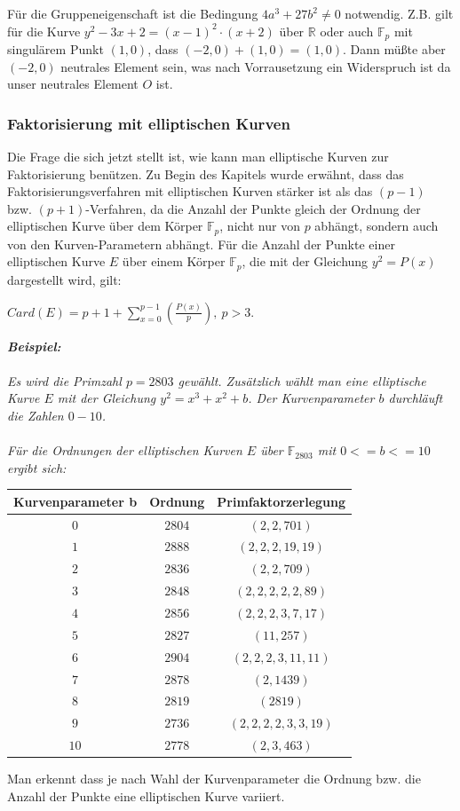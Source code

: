 \documentclass[10pt, bigheadings]{scrartcl}
\begin{document}
Für die Gruppeneigenschaft ist die Bedingung $4a^3+27b^2 \neq 0$ notwendig. Z.B.
gilt für die Kurve $y^2-3x+2 = (x-1)^2\cdot(x+2)$ über $\mathbb R$ oder auch 
$\mathbb F_p$ mit singulärem Punkt $(1,0)$, dass $(-2,0)+(1,0) = (1,0)$. Dann
müßte aber $(-2,0)$ neutrales Element sein, was nach Vorrausetzung ein 
Widerspruch ist da unser neutrales Element $O$ ist. 

\subsubsection*{Faktorisierung mit elliptischen Kurven}
Die Frage die sich jetzt stellt ist, wie kann man elliptische Kurven zur 
Faktorisierung benützen. Zu Begin des Kapitels wurde erwähnt, dass das 
Faktorisierungsverfahren mit elliptischen Kurven stärker ist als das $(p-1)$
bzw. $(p+1)$-Verfahren, da die Anzahl der Punkte gleich der Ordnung der
elliptischen
Kurve über dem Körper $\mathbb F_p$, nicht nur von $p$ abhängt, sondern auch
von den Kurven-Parametern abhängt. Für die Anzahl der Punkte einer elliptischen 
Kurve $E$ über einem Körper $\mathbb F_p$, die mit der Gleichung $y^2 = P(x)$ 
dargestellt wird, gilt: 
\begin{center}
$Card(E) = p+1+\sum_{x=0}^{p-1}(\frac{P(x)}{p}),\ p>3$.
\end{center}
{\it
\textbf{Beispiel:}\\\\
Es wird die Primzahl $p=2803$ gewählt. Zusätzlich wählt man eine elliptische
Kurve $E$ mit der Gleichung $y^2 = x^3+x^2+b$. Der Kurvenparameter $b$ 
durchläuft die Zahlen $0-10$.\\\\
Für die Ordnungen der elliptischen Kurven $E$ über $\mathbb F_2803$ mit 
$0<=b<=10$ ergibt sich:\\

\begin{center}
\begin{tabular}{|c|c|c|}
\hline
\textbf{Kurvenparameter b} & \textbf{Ordnung} & \textbf{Primfaktorzerlegung}\\
\hline
$0$ & $2804$ & $(2,2,701)$ \\
\hline
$1$ & $2888$ & $(2,2,2,19,19)$ \\
\hline
$2$ & $2836$ & $(2,2,709)$ \\
\hline
$3$ & $2848$ & $(2,2,2,2,2,89)$ \\
\hline
$4$ & $2856$ & $(2,2,2,3,7,17)$ \\
\hline
$5$ & $2827$ & $(11,257)$ \\
\hline
$6$ & $2904$ & $(2,2,2,3,11,11)$ \\
\hline
$7$ & $2878$ & $(2,1439)$ \\
\hline
$8$ & $2819$ & $(2819)$ \\
\hline
$9$ & $2736$ & $(2,2,2,2,3,3,19)$ \\
\hline
$10$ & $2778$ & $(2,3,463)$ \\
\hline
\end{tabular}
\end{center}
Man erkennt dass je nach Wahl der Kurvenparameter die Ordnung bzw. die Anzahl
der Punkte eine elliptischen Kurve variiert.
}\\\\
\end{document}
